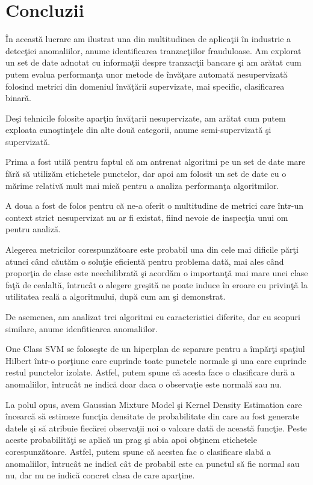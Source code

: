 \chapter{Concluzii}

În această lucrare am ilustrat una din multitudinea de aplicaţii în industrie a 
detecţiei anomaliilor, anume identificarea tranzacţiilor frauduloase. Am explorat un 
set de date adnotat cu informaţii despre tranzacţii bancare şi am arătat cum putem evalua
performanţa unor metode de învăţare automată nesupervizată folosind metrici din domeniul 
învăţării supervizate, mai specific, clasificarea binară.

Deşi tehnicile folosite aparţin învăţarii nesupervizate, am arătat cum putem exploata
cunoştinţele din alte două categorii, anume semi-supervizată şi supervizată. 

Prima a fost 
utilă pentru faptul că am antrenat algoritmi pe un set de date mare fără să utilizăm 
etichetele punctelor, dar apoi am folosit un set de date cu o mărime relativă mult mai mică
pentru a analiza performanţa algoritmilor. 

A doua a fost de folos pentru că ne-a oferit 
o multitudine de metrici care într-un context strict nesupervizat nu ar fi existat, fiind 
nevoie de inspecţia unui om pentru analiză.

Alegerea metricilor corespunzătoare
este probabil una din cele mai dificile părţi atunci când căutăm o soluţie eficientă pentru 
problema dată, mai ales când proporţia de clase este neechilibrată şi acordăm o importanţă mai 
mare unei clase faţă de cealaltă, întrucât o alegere greşită ne poate induce în eroare cu privinţă
la utilitatea reală a algoritmului, după cum am şi demonstrat.

De asemenea, am analizat trei algoritmi cu caracteristici diferite, dar cu 
scopuri similare, anume idenfiticarea anomaliilor.

One Class SVM se 
foloseşte de un hiperplan de separare pentru a împărţi spaţiul Hilbert într-o porţiune 
care cuprinde toate punctele normale şi una care cuprinde restul punctelor izolate. Astfel,
putem spune că acesta face o clasificare dură a anomaliilor, întrucât ne indică doar daca
o observaţie este normală sau nu. 

La polul opus, avem Gaussian Mixture Model şi Kernel Density 
Estimation care încearcă să estimeze funcţia densitate de probabilitate din care au fost 
generate datele şi să atribuie fiecărei observaţii noi o valoare dată de această funcţie.
Peste aceste probabilităţi se aplică un prag şi abia apoi obţinem etichetele corespunzătoare.
Astfel, putem spune că acestea fac o clasificare slabă a anomaliilor, întrucât ne indică 
cât de probabil este ca punctul să fie normal sau nu, dar nu ne indică concret clasa 
de care aparţine.

